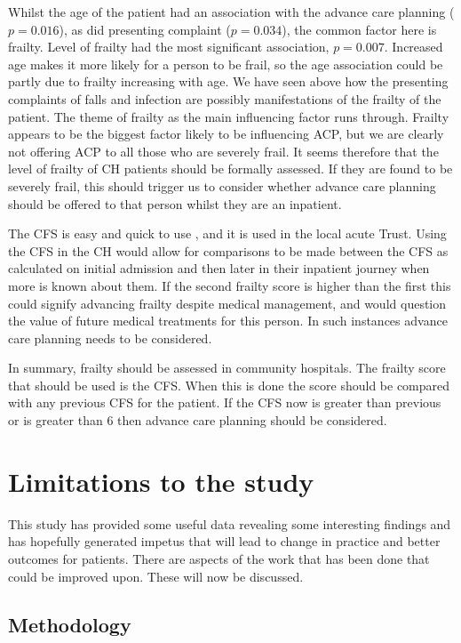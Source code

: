 \documentclass
[
	12pt,
	a4paper,
	oneside,
]{report}
\begin{document}
Whilst the age of the patient
had an association with the advance care planning ($p=0.016$), as did 
presenting complaint ($p=0.034$),
the common factor here is frailty. Level of frailty had the most 
significant association, $p=0.007$. Increased age makes it more likely for a 
person to be frail, so the age association could be partly due to frailty
increasing with age. We have seen above how the presenting complaints of 
falls and infection are possibly manifestations of the frailty of the patient.
The theme of frailty as the main influencing factor runs through. Frailty 
appears to be the biggest factor likely to be influencing ACP, but we are 
clearly
not offering ACP to all those who are severely frail. It seems therefore that
the level of frailty of CH patients should be formally assessed. If they 
are found 
to be severely frail, this should trigger us to consider whether advance 
care planning should be offered to that person whilst they are an inpatient.

The CFS is easy and quick to use \parencite{elliott:17}, and it is used in the 
local acute Trust. 
Using the CFS in the CH would allow for comparisons to be made between the CFS 
as calculated on initial admission and then later in their inpatient journey
when more is known about them. If the second frailty score is higher than the
first this could signify advancing frailty despite medical management, 
and would question the value of future medical treatments for this person.
In such instances advance care planning needs to be considered. 

In summary, frailty should be assessed in community hospitals. The frailty score
that should be used is the CFS. When this is done the score should be compared
with any previous CFS for the patient. If the CFS now is greater than previous
or is greater than 6 then advance care planning should be considered.

\section{Limitations to the study}

This study has provided some useful data revealing some interesting findings
and has hopefully generated impetus that will lead to change in practice and
better outcomes for patients. There are aspects of the work that has been done
that could be improved upon. These will now be discussed.

\subsection{Methodology}
\end{document}
